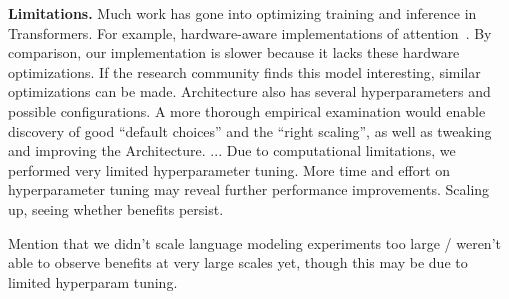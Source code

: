 
\textbf{Limitations.} Much work has gone into optimizing training and inference in Transformers. For example, hardware-aware implementations of attention~\citep{flashattention}. By comparison, our implementation is slower because it lacks these hardware optimizations. If the research community finds this model interesting, similar optimizations can be made. Architecture also has several hyperparameters and possible configurations. A more thorough empirical examination would enable discovery of good ``default choices'' and the ``right scaling'', as well as tweaking and improving the Architecture. ... Due to computational limitations, we performed very limited hyperparameter tuning. More time and effort on hyperparameter tuning may reveal further performance improvements. Scaling up, seeing whether benefits persist.

Mention that we didn't scale language modeling experiments too large / weren't able to observe benefits at very large scales yet, though this may be due to limited hyperparam tuning.